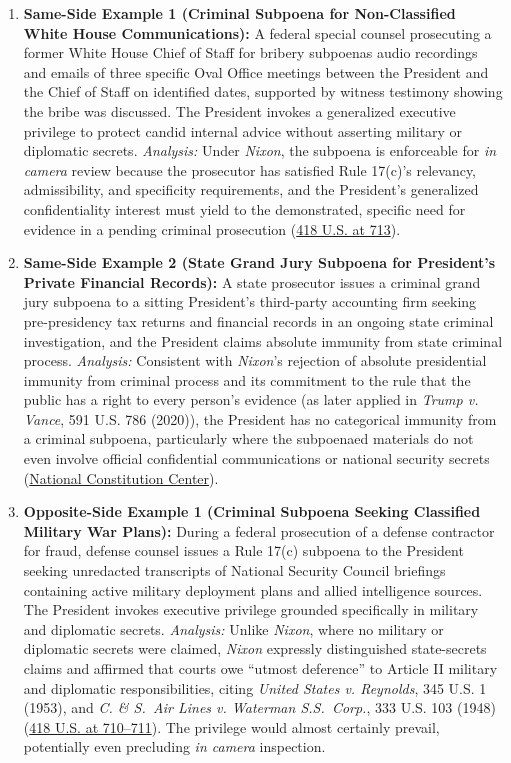 \documentclass[12pt]{article}
\begin{document}
\begin{enumerate}
\item \textbf{Same-Side Example 1 (Criminal Subpoena for Non-Classified White House Communications):} A federal special counsel prosecuting a former White House Chief of Staff for bribery subpoenas audio recordings and emails of three specific Oval Office meetings between the President and the Chief of Staff on identified dates, supported by witness testimony showing the bribe was discussed. The President invokes a generalized executive privilege to protect candid internal advice without asserting military or diplomatic secrets. \textit{Analysis:} Under \textit{Nixon}, the subpoena is enforceable for \textit{in camera} review because the prosecutor has satisfied Rule 17(c)'s relevancy, admissibility, and specificity requirements, and the President's generalized confidentiality interest must yield to the demonstrated, specific need for evidence in a pending criminal prosecution (\href{https://supreme.justia.com/cases/federal/us/418/683/}{418 U.S. at 713}).

\item \textbf{Same-Side Example 2 (State Grand Jury Subpoena for President's Private Financial Records):} A state prosecutor issues a criminal grand jury subpoena to a sitting President's third-party accounting firm seeking pre-presidency tax returns and financial records in an ongoing state criminal investigation, and the President claims absolute immunity from state criminal process. \textit{Analysis:} Consistent with \textit{Nixon}'s rejection of absolute presidential immunity from criminal process and its commitment to the rule that the public has a right to every person's evidence (as later applied in \textit{Trump v. Vance}, 591 U.S. 786 (2020)), the President has no categorical immunity from a criminal subpoena, particularly where the subpoenaed materials do not even involve official confidential communications or national security secrets (\href{https://constitutioncenter.org/the-constitution/supreme-court-case-library/united-states-v-nixon-tapes-case}{National Constitution Center}).

\item \textbf{Opposite-Side Example 1 (Criminal Subpoena Seeking Classified Military War Plans):} During a federal prosecution of a defense contractor for fraud, defense counsel issues a Rule 17(c) subpoena to the President seeking unredacted transcripts of National Security Council briefings containing active military deployment plans and allied intelligence sources. The President invokes executive privilege grounded specifically in military and diplomatic secrets. \textit{Analysis:} Unlike \textit{Nixon}, where no military or diplomatic secrets were claimed, \textit{Nixon} expressly distinguished state-secrets claims and affirmed that courts owe ``utmost deference'' to Article II military and diplomatic responsibilities, citing \textit{United States v. Reynolds}, 345 U.S. 1 (1953), and \textit{C. \& S.\ Air Lines v. Waterman S.S.\ Corp.}, 333 U.S. 103 (1948) (\href{https://supreme.justia.com/cases/federal/us/418/683/}{418 U.S. at 710--711}). The privilege would almost certainly prevail, potentially even precluding \textit{in camera} inspection.


\end{enumerate}
\end{document}
